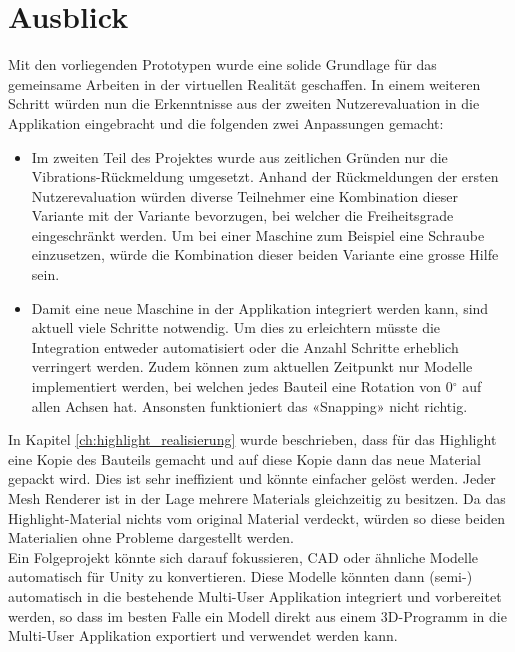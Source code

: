 \chapter{Ausblick}
\label{ch:Ausblick}

Mit den vorliegenden Prototypen wurde eine solide Grundlage für das gemeinsame Arbeiten in der virtuellen Realität geschaffen. In einem weiteren Schritt würden nun die Erkenntnisse aus der zweiten Nutzerevaluation in die Applikation eingebracht und die folgenden zwei Anpassungen gemacht:

\begin{itemize}
	\item Im zweiten Teil des Projektes wurde aus zeitlichen Gründen nur die Vibrations-Rückmeldung umgesetzt. Anhand der Rückmeldungen der ersten Nutzerevaluation würden diverse Teilnehmer eine Kombination dieser Variante mit der Variante bevorzugen, bei welcher die Freiheitsgrade eingeschränkt werden. Um bei einer Maschine zum Beispiel eine Schraube einzusetzen, würde die Kombination dieser beiden Variante eine grosse Hilfe sein.
	
	\item Damit eine neue Maschine in der Applikation integriert werden kann, sind aktuell viele Schritte notwendig. Um dies zu erleichtern müsste die Integration entweder automatisiert oder die Anzahl Schritte erheblich verringert werden. Zudem können zum aktuellen Zeitpunkt nur Modelle implementiert werden, bei welchen jedes Bauteil eine Rotation von 0$^{\circ}$ auf allen Achsen hat. Ansonsten funktioniert das «Snapping» nicht richtig.
\end{itemize}

In Kapitel \ref{ch:highlight_realisierung} wurde beschrieben, dass für das Highlight eine Kopie des Bauteils gemacht und auf diese Kopie dann das neue Material gepackt wird. Dies ist sehr ineffizient und könnte einfacher gelöst werden. Jeder \grqq Mesh Renderer\grqq{} ist in der Lage mehrere Materials gleichzeitig zu besitzen. Da das Highlight-Material nichts vom original Material verdeckt, würden so diese beiden Materialien ohne Probleme dargestellt werden. \\

\noindent Ein Folgeprojekt könnte sich darauf fokussieren, CAD oder ähnliche Modelle automatisch für Unity zu konvertieren. Diese Modelle könnten dann (semi-) automatisch in die bestehende Multi-User Applikation integriert und vorbereitet werden, so dass im besten Falle ein Modell direkt aus einem 3D-Programm in die Multi-User Applikation exportiert und verwendet werden kann.